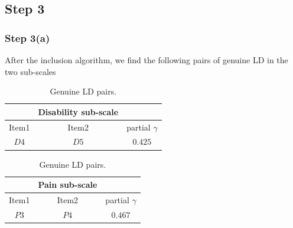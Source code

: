 \documentclass[a4project,12pt]{article}
\theoremstyle{examplestyle}
\theoremstyle{defstyle}
\theoremstyle{thmstyle}
\begin{document}
\subsection{Step 3}
\subsubsection{Step 3(a)}
After the inclusion algorithm, we find the following pairs of genuine LD in the two sub-scales
\begin{table}[H]
    \centering
    \begin{minipage}{0.45\textwidth}
        \centering
        \begin{tabular}{c c c}
            & Disability sub-scale & \\ 
            \hline
            Item1 & Item2 & partial $\gamma$ \\ 
            \hline 
            $D4$ & $D5$ & $0.425$ \\
            \hline 
        \end{tabular}
        \caption{Genuine LD pairs.}
        \label{tab:disability_partial_gamma}
    \end{minipage}
    \hfill
    \begin{minipage}{0.45\textwidth}
        \centering
        \begin{tabular}{c c c}
            & Pain sub-scale & \\ 
            \hline
            Item1 & Item2 & partial $\gamma$ \\ 
            \hline 
            $P3$ & $P4$ & $0.467$ \\
            \hline 
        \end{tabular}
        \caption{Genuine LD pairs.}
        \label{tab:pain_partial_gamma}
    \end{minipage}
\end{table}
\end{document}
